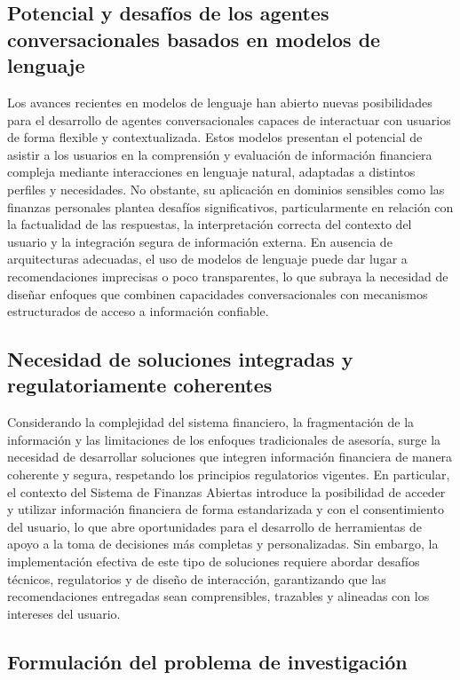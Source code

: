 \documentclass[
	spanish, %
	letterpaper, oneside
]{book}
\begin{document}
\subsection{Potencial y desafíos de los agentes conversacionales basados en modelos de lenguaje}

Los avances recientes en modelos de lenguaje han abierto nuevas posibilidades para el desarrollo de agentes conversacionales capaces de interactuar con usuarios de forma flexible y contextualizada. Estos modelos presentan el potencial de asistir a los usuarios en la comprensión y evaluación de información financiera compleja mediante interacciones en lenguaje natural, adaptadas a distintos perfiles y necesidades. No obstante, su aplicación en dominios sensibles como las finanzas personales plantea desafíos significativos, particularmente en relación con la factualidad de las respuestas, la interpretación correcta del contexto del usuario y la integración segura de información externa. En ausencia de arquitecturas adecuadas, el uso de modelos de lenguaje puede dar lugar a recomendaciones imprecisas o poco transparentes, lo que subraya la necesidad de diseñar enfoques que combinen capacidades conversacionales con mecanismos estructurados de acceso a información confiable.

\subsection{Necesidad de soluciones integradas y regulatoriamente coherentes}

Considerando la complejidad del sistema financiero, la fragmentación de la información y las limitaciones de los enfoques tradicionales de asesoría, surge la necesidad de desarrollar soluciones que integren información financiera de manera coherente y segura, respetando los principios regulatorios vigentes. En particular, el contexto del Sistema de Finanzas Abiertas introduce la posibilidad de acceder y utilizar información financiera de forma estandarizada y con el consentimiento del usuario, lo que abre oportunidades para el desarrollo de herramientas de apoyo a la toma de decisiones más completas y personalizadas. Sin embargo, la implementación efectiva de este tipo de soluciones requiere abordar desafíos técnicos, regulatorios y de diseño de interacción, garantizando que las recomendaciones entregadas sean comprensibles, trazables y alineadas con los intereses del usuario.

\subsection{Formulación del problema de investigación}
\end{document}
